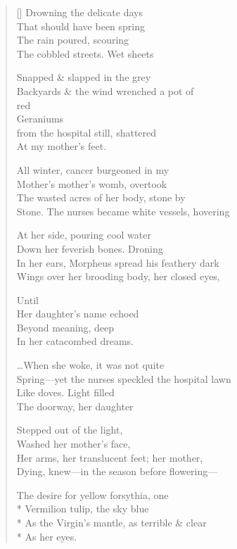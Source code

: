 \label{ch:springreturns}
\settowidth{\versewidth}{Stone. \qquad The nurses became white vessels, hovering}
\begin{verse}[\versewidth]
Drowning the delicate days\\
That should have been spring\\
The rain poured, scouring\\
The cobbled streets. \qquad Wet sheets

Snapped \& slapped in the grey\\
Backyards \& the wind wrenched a pot of\\
\hspace*{7\vgap} red\\
Geraniums\\
\hfill from the hospital still, shattered\\
At my mother's feet.

All winter, cancer burgeoned in my\\
Mother's mother's womb, overtook\\
The wasted acres of her body, stone by\\
Stone. \qquad The nurses became white vessels, hovering

At her side, pouring cool water\\
Down her feverish bones. \qquad Droning\\
In her ears, Morpheus spread his feathery dark\\
Wings over her brooding body, her closed eyes,

Until\\
Her daughter's name echoed\\
Beyond meaning, deep\\
In her catacombed dreams.

\ldots When she woke, it was not quite\\
Spring---yet the nurses speckled the hospital lawn\\
Like doves. \qquad Light filled\\
The doorway, her daughter

Stepped out of the light,\\
Washed her mother's face,\\
Her arms, her translucent feet; her mother,\\
Dying, knew---in the season before flowering---

The desire for yellow forsythia, one\\*
Vermilion tulip, the sky blue\\*
As the Virgin's mantle, as terrible \& clear\\*
As her eyes.
\end{verse}
